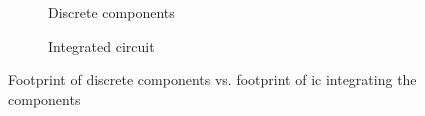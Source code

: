 \begin{figure}[H]
	\centering
	\begin{subfigure}{0.4\textwidth}
		\centering
		\caption{Discrete components}
		\label{fig:discreteComp}
	\end{subfigure}\hfill
	\begin{subfigure}{0.4\textwidth}
		\centering
		\caption{Integrated circuit}
		\label{fig:integratedComp}
	\end{subfigure}
	\caption[Discrete components vs. IC]{Footprint of discrete components vs. footprint of \gls{ic} integrating the components}
	\label{fig:footprint}
\end{figure}
